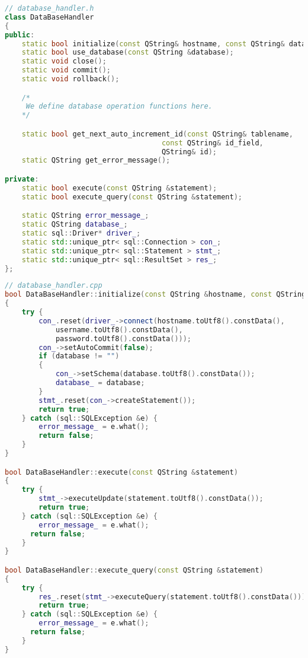 \begin{lstlisting}[language=C++, caption={Header of the Database Handler\label{lst:Header of the Database Handler}}]
// database_handler.h
class DataBaseHandler
{
public:
    static bool initialize(const QString& hostname, const QString& database, const QString& username, const QString& password);
    static bool use_database(const QString &database);
    static void close();
    static void commit();
    static void rollback();

    /*
     We define database operation functions here.
    */

    static bool get_next_auto_increment_id(const QString& tablename, 
                                     const QString& id_field, 
                                     QString& id);
    static QString get_error_message();

private:
    static bool execute(const QString &statement);
    static bool execute_query(const QString &statement);

    static QString error_message_;
    static QString database_;
    static sql::Driver* driver_;
    static std::unique_ptr< sql::Connection > con_;
    static std::unique_ptr< sql::Statement > stmt_;
    static std::unique_ptr< sql::ResultSet > res_;
};
\end{lstlisting}

\begin{lstlisting}[language=C++, caption={Source Code of the Database Handler\label{lst:Source Code of the Database Handler}}]
// database_handler.cpp
bool DataBaseHandler::initialize(const QString &hostname, const QString &database, const QString& username, const QString& password)
{
    try {
        con_.reset(driver_->connect(hostname.toUtf8().constData(),
            username.toUtf8().constData(),
            password.toUtf8().constData()));
        con_->setAutoCommit(false);
        if (database != "")
        {
            con_->setSchema(database.toUtf8().constData());
            database_ = database;
        }
        stmt_.reset(con_->createStatement());
        return true;
    } catch (sql::SQLException &e) {
        error_message_ = e.what();
        return false;
    }
}

bool DataBaseHandler::execute(const QString &statement)
{
    try {
        stmt_->executeUpdate(statement.toUtf8().constData());
        return true;
    } catch (sql::SQLException &e) {
        error_message_ = e.what();
      return false;
    }
}

bool DataBaseHandler::execute_query(const QString &statement)
{
    try {
        res_.reset(stmt_->executeQuery(statement.toUtf8().constData()));
        return true;
    } catch (sql::SQLException &e) {
        error_message_ = e.what();
      return false;
    }
}
\end{lstlisting}

